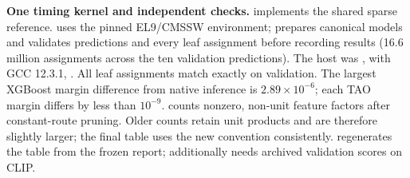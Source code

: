 \begin{implementation}
\textbf{One timing kernel and independent checks.}
 implements the shared sparse reference.
 uses the pinned EL9/CMSSW environment;
 prepares canonical models and validates
predictions and every leaf assignment before recording results (16.6 million assignments across
the ten validation predictions). The host was
, with GCC 12.3.1,
. All leaf assignments match exactly on
validation. The largest XGBoost margin difference from native inference is
$2.89\times10^{-6}$; each TAO margin differs by less than $10^{-9}$.
 counts nonzero, non-unit feature factors after constant-route
pruning. Older  counts retain unit products and are
therefore slightly larger; the final table uses the new convention consistently.
 regenerates the table from the frozen
report;  additionally needs archived validation scores on CLIP.
\end{implementation}
